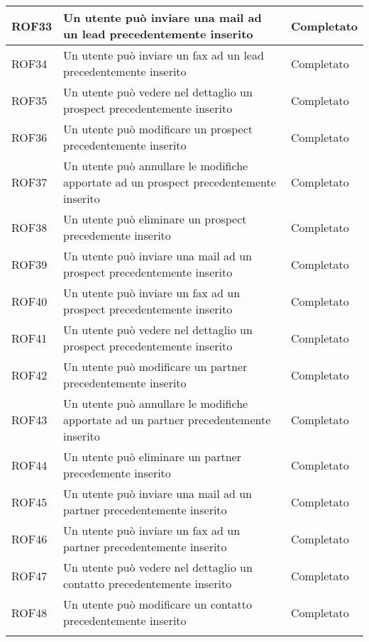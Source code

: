 \begin{longtable}[H]{|p{3cm}|p{8cm}|p{3cm}|}
	\hline
	\rule[-3mm]{0mm}{0.8cm}
	ROF33&Un utente può inviare una mail ad un lead precedentemente inserito&Completato \\
	\hline
	\rule[-3mm]{0mm}{0.8cm}
	ROF34&Un utente può inviare un fax ad un lead precedentemente inserito&Completato \\
	\hline
	\rule[-3mm]{0mm}{0.8cm}
	ROF35&Un utente può vedere nel dettaglio un prospect precedentemente inserito&Completato\\
	\hline
	\rule[-3mm]{0mm}{0.8cm}
	ROF36&Un utente può modificare un prospect precedentemente inserito&Completato\\
	\hline
	\rule[-3mm]{0mm}{0.8cm}
	ROF37&Un utente può annullare le modifiche apportate ad un prospect precedentemente inserito&Completato\\
	\hline
	\rule[-3mm]{0mm}{0.8cm}
	ROF38&Un utente può eliminare un prospect precedemente inserito&Completato\\
	\hline
	\rule[-3mm]{0mm}{0.8cm}
	ROF39&Un utente può inviare una mail ad un prospect precedentemente inserito&Completato \\
	\hline
	\rule[-3mm]{0mm}{0.8cm}
	ROF40&Un utente può inviare un fax ad un prospect precedentemente inserito&Completato \\
	\hline
	\rule[-3mm]{0mm}{0.8cm}
	ROF41&Un utente può vedere nel dettaglio un prospect precedentemente inserito&Completato\\
	\hline
	\rule[-3mm]{0mm}{0.8cm}
	ROF42&Un utente può modificare un partner precedentemente inserito&Completato\\
	\hline
	\rule[-3mm]{0mm}{0.8cm}
	ROF43&Un utente può annullare le modifiche apportate ad un partner precedentemente inserito&Completato\\
	\hline
	\rule[-3mm]{0mm}{0.8cm}
	ROF44&Un utente può eliminare un partner precedemente inserito&Completato\\
	\hline
	\rule[-3mm]{0mm}{0.8cm}
	ROF45&Un utente può inviare una mail ad un partner precedentemente inserito&Completato \\
	\hline
	\rule[-3mm]{0mm}{0.8cm}
	ROF46&Un utente può inviare un fax ad un partner precedentemente inserito&Completato \\
	\hline\rule[-3mm]{0mm}{0.8cm}
	ROF47&Un utente può vedere nel dettaglio un contatto precedentemente inserito&Completato\\
	\hline
	\rule[-3mm]{0mm}{0.8cm}
	ROF48&Un utente può modificare un contatto precedentemente inserito&Completato\\
	\hline
	\rule[-3mm]{0mm}{0.8cm}

\end{longtable}
